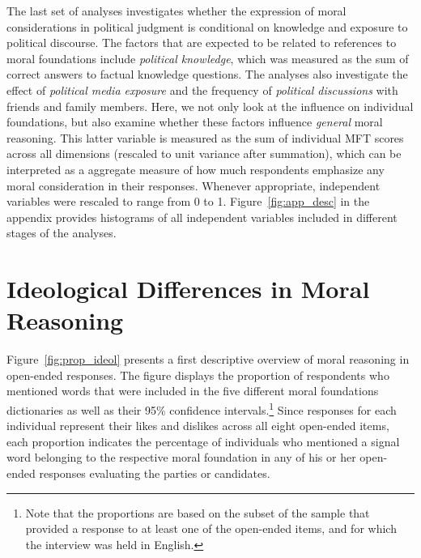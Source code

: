 \documentclass[12pt]{article}
\begin{document}
The last set of analyses investigates whether the expression of moral considerations in political judgment is conditional on knowledge and exposure to political discourse. The factors that are expected to be related to references to moral foundations include \textit{political knowledge}, which was measured as the sum of correct answers to factual knowledge questions. The analyses also investigate the effect of \textit{political media exposure} and the frequency of \textit{political discussions} with friends and family members. Here, we not only look at the influence on individual foundations, but also examine whether these factors influence \textit{general} moral reasoning. This latter variable is measured as the sum of individual MFT scores across all dimensions (rescaled to unit variance after summation), which can be interpreted as a aggregate measure of how much respondents emphasize any moral consideration in their responses. Whenever appropriate, independent variables were rescaled to range from 0 to 1. Figure~\ref{fig:app_desc} in the appendix provides histograms of all independent variables included in different stages of the analyses.


\section*{Ideological Differences in Moral Reasoning}

Figure~\ref{fig:prop_ideol} presents a first descriptive overview of moral reasoning in open-ended responses. The figure displays the proportion of respondents who mentioned words that were included in the five different moral foundations dictionaries as well as their 95\% confidence intervals.\footnote{Note that the proportions are based on the subset of the sample that provided a response to at least one of the open-ended items, and for which the interview was held in English.} Since responses for each individual represent their likes and dislikes across all eight open-ended items, each proportion indicates the percentage of individuals who mentioned a signal word belonging to the respective moral foundation in any of his or her open-ended responses evaluating the parties or candidates.
\end{document}

